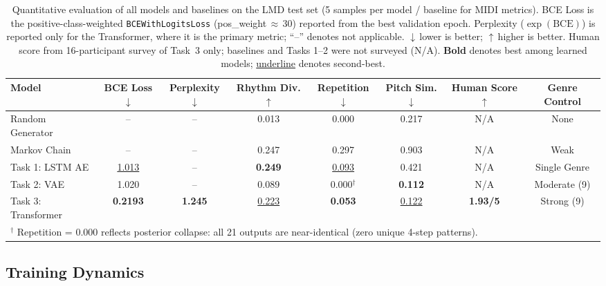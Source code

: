\documentclass[letterpaper]{article}
\begin{document}
\begin{table}[ht]
  \centering
  \caption{Quantitative evaluation of all models and baselines on the LMD
    test set (5 samples per model / baseline for MIDI metrics).
    BCE Loss is the positive-class-weighted \texttt{BCEWithLogitsLoss}
    (pos\_weight\,$\approx$\,30) reported from the best validation epoch.
    Perplexity ($\exp(\mathrm{BCE})$) is reported only for the Transformer,
    where it is the primary metric; ``--'' denotes not applicable.
    $\downarrow$\,lower is better; $\uparrow$\,higher is better.
    Human score from 16-participant survey of Task~3 only; baselines and
    Tasks 1--2 were not surveyed (N/A).
    \textbf{Bold} denotes best among learned models; \underline{underline}
    denotes second-best.}
  \label{tab:results}
  \small
  \setlength{\tabcolsep}{5pt}
  \begin{tabular}{lcccccc c}
    \toprule
    \textbf{Model}
      & \textbf{BCE Loss}$\downarrow$
      & \textbf{Perplexity}$\downarrow$
      & \textbf{Rhythm Div.}$\uparrow$
      & \textbf{Repetition}$\downarrow$
      & \textbf{Pitch Sim.}$\downarrow$
      & \textbf{Human Score}$\uparrow$
      & \textbf{Genre Control} \\
    \midrule
    Random Generator  & --      & --      & 0.013 & 0.000 & 0.217 & N/A & None         \\
    Markov Chain      & --      & --      & 0.247 & 0.297 & 0.903 & N/A & Weak         \\
    \midrule
    Task 1: LSTM AE   & \underline{1.013} & --      & \textbf{0.249}
                      & \underline{0.093} & 0.421 & N/A & Single Genre \\
    Task 2: VAE       & 1.020   & --      & 0.089 & 0.000$^\dagger$ & \textbf{0.112}
                      & N/A & Moderate (9) \\
    Task 3: Transformer & \textbf{0.2193} & \textbf{1.245} & \underline{0.223}
                        & \textbf{0.053} & \underline{0.122} & \textbf{1.93/5} & Strong (9) \\
    \bottomrule
    \multicolumn{8}{l}{%
      $^\dagger$ Repetition = 0.000 reflects posterior collapse: all 21 outputs are
      near-identical (zero unique 4-step patterns).}
  \end{tabular}
\end{table}

\subsection{Training Dynamics}
\end{document}
